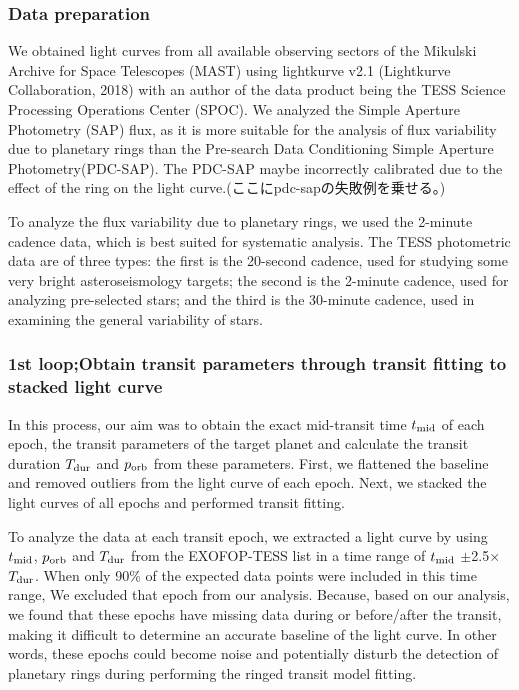 \documentclass[fleqn,usenatbib, onecolumn,dvipdfmx]{mnras}
\begin{document}
\subsubsection{Data preparation} \label{Data preparation}
We obtained light curves from all available observing sectors of the Mikulski Archive for Space Telescopes (MAST) using lightkurve v2.1 (Lightkurve Collaboration, 2018) with an author of the data product being the TESS Science Processing Operations Center (SPOC).
We analyzed the Simple Aperture Photometry (SAP) flux, as it is more suitable for the analysis of flux variability due to planetary rings than the Pre-search Data Conditioning Simple Aperture Photometry(PDC-SAP). The PDC-SAP maybe incorrectly calibrated due to the effect of the ring on the light curve.(ここにpdc-sapの失敗例を乗せる。)

To analyze the flux variability due to planetary rings, we used the 2-minute cadence data, which is best suited for systematic analysis. The TESS photometric data are of three types: the first is the 20-second cadence, used for studying some very bright asteroseismology targets; the second is the 2-minute cadence, used for analyzing pre-selected stars; and the third is the 30-minute cadence, used in examining the general variability of stars.



\subsubsection{1st loop;Obtain transit parameters through transit fitting to stacked light curve} \label{Obtain transit parameters}


In this process, our aim was to obtain the exact mid-transit time $t_{\rm{mid}}$ of each epoch, the transit parameters of the target planet and calculate the transit duration $T_{\rm{dur}}$ and $p_{\rm{orb}}$ from these parameters. First, we flattened the baseline and removed outliers from the light curve of each epoch. Next, we stacked the light curves of all epochs and performed transit fitting.

To analyze the data at each transit epoch, we extracted a light curve by using $t_{\rm{mid}}$, $p_{\rm{orb}}$ and $T_{\rm{dur}}$ from the EXOFOP-TESS list in a time range of $t_{\rm{mid}}$ $\pm$2.5× $T_{\rm{dur}}$. When only 90\% of the expected data points were included in this time range, We excluded that epoch from our analysis. Because, based on our analysis, we found that these epochs have missing data during or before/after the transit, making it difficult to determine an accurate baseline of the light curve. In other words, these epochs could become noise and potentially disturb the detection of planetary rings during performing the ringed transit model fitting.
\end{document}
